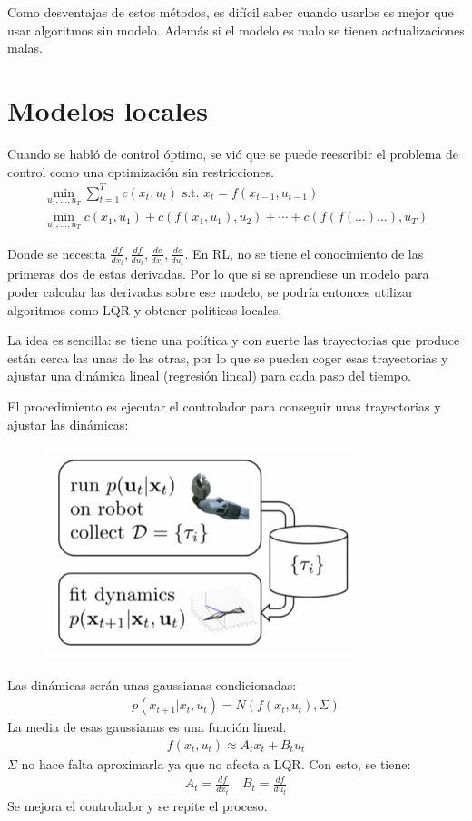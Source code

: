Como desventajas de estos métodos, es difícil saber cuando usarlos es mejor que usar algoritmos
sin modelo. Además si el modelo es malo se tienen actualizaciones malas.

\section{Modelos locales}%
\label{sec:modelos_locales}

Cuando se habló de control óptimo, se vió que se puede reescribir el problema de control
como una optimización sin restricciones.
\begin{align}
\operatorname { min } _ { u _ { 1 } , \ldots , u _ { T } } \sum _ { t = 1 } ^ { T } c ( x _ { t }
, u _ { t } ) \text { s.t. } x _ { t } = f ( x _ { t - 1 } , u _ { t - 1 } )\\
\operatorname { min } _ { u _ { 1 } , \ldots , u _ { T } } c ( x _ { 1 } , u _ { 1 } ) + c ( f ( x _ { 1 } , u _ { 1 } ) , u _ { 2 } ) + \cdots + c ( f ( f ( \ldots ) \ldots ) , u _ { T } )
\end{align}

Donde se necesita $\frac{df}{dx_t},\frac{df}{du_t},\frac{dc}{dx_t},\frac{dc}{du_t}$. En
RL, no se tiene el conocimiento de las primeras dos de estas derivadas. Por lo que si se
aprendiese un modelo para poder calcular las derivadas sobre ese modelo, se podría entonces
utilizar algoritmos como LQR y obtener políticas locales.

La idea es sencilla: se tiene una política y con suerte las trayectorias que produce están cerca
las unas de las otras, por lo que se pueden coger esas trayectorias y ajustar una dinámica
lineal (regresión lineal) para cada paso del tiempo.

El procedimiento es ejecutar el controlador para conseguir unas trayectorias y ajustar las
dinámicas:
\begin{figure}[H]
	\centering
	\includegraphics[width=0.3\linewidth]{figures/2020-07-02-173627_351x235_scrot.png}
\end{figure}
Las dinámicas serán unas gaussianas condicionadas:
\begin{align}
p ( x _ { t + 1 } | x _ { t } , u _ { t } ) = N ( f ( x _ { t } , u _ { t } ) , \Sigma )
\end{align}
La media de esas gaussianas es una función lineal.
\begin{align}
f ( x _ { t } , u _ { t } ) \approx A _ { t } x _ { t } + B _ { t } u _ { t }
\end{align}
$\Sigma$ no hace falta aproximarla ya que no afecta a LQR. Con esto, se tiene:
\begin{align}
A _ { t } = \frac { d f } { d x _ { t } } \quad B _ { t } = \frac { d f } { d u _ { t } }
\end{align}
Se mejora el controlador y se repite el proceso.

